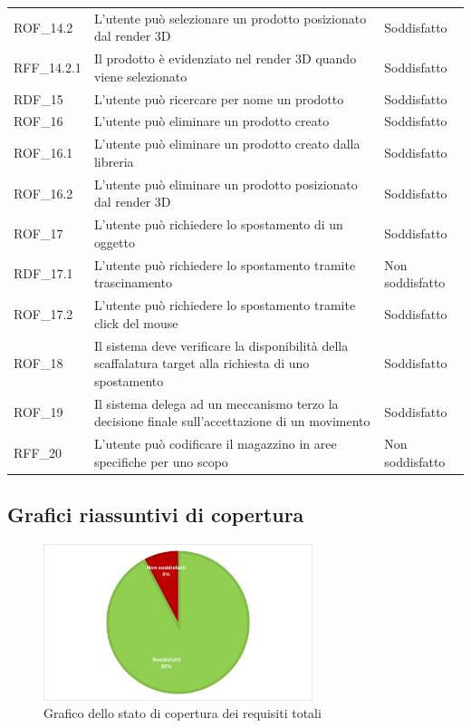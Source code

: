 \begin{xltabular}{\textwidth}{ p{0.1\textwidth} | X | p{0.3\textwidth} }
    ROF\_14.2 & L'utente può selezionare un prodotto posizionato dal render 3D & Soddisfatto\\
    RFF\_14.2.1 & Il prodotto è evidenziato nel render 3D quando viene selezionato & Soddisfatto\\
    RDF\_15 & L'utente può ricercare per nome un prodotto & Soddisfatto\\
    ROF\_16 & L'utente può eliminare un prodotto creato & Soddisfatto\\
    ROF\_16.1 & L'utente può eliminare un prodotto creato dalla libreria & Soddisfatto\\
    ROF\_16.2 & L'utente può eliminare un prodotto posizionato dal render 3D & Soddisfatto\\
    ROF\_17 & L'utente può richiedere lo spostamento di un oggetto & Soddisfatto\\
    RDF\_17.1 & L'utente può richiedere lo spostamento tramite trascinamento & Non soddisfatto\\
    ROF\_17.2 & L'utente può richiedere lo spostamento tramite click del mouse & Soddisfatto\\
    ROF\_18 & Il sistema deve verificare la disponibilità della scaffalatura target alla richiesta di uno spostamento & Soddisfatto\\
    ROF\_19 & Il sistema delega ad un meccanismo terzo la decisione finale sull'accettazione di un movimento & Soddisfatto\\
    RFF\_20 & L'utente può codificare il magazzino in aree specifiche per uno scopo & Non soddisfatto\\
    \hline
\end{xltabular}

\subsection{Grafici riassuntivi di copertura}
\begin{figure}[H]
    \centering
    \includegraphics[width=0.7\textwidth]{images/stato_req_totali.png}
    \caption{Grafico dello stato di copertura dei requisiti totali}
\end{figure}

